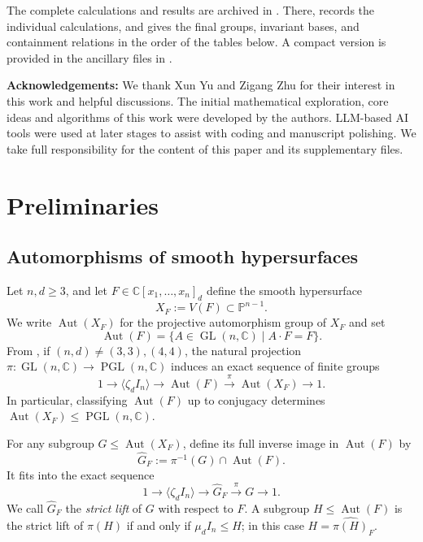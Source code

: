 \documentclass[12pt]{amsart}
\numberwithin{equation}{section}
\theoremstyle{plain}
\theoremstyle{definition}
\theoremstyle{remark}
\newcommand{\CC}{\mathbb C}
\newcommand{\PP}{\mathbb P}
\DeclareMathOperator{\Aut}{Aut}
\DeclareMathOperator{\GL}{GL}
\DeclareMathOperator{\PGL}{PGL}
\begin{document}
The complete calculations and results are archived in
\cite{FuWangZhengAutcub4fold2026}. There,  records
the individual calculations, and  gives the final groups,
invariant bases, and containment relations in the order of the tables below.
A compact version is provided in the ancillary files in .

\textbf{Acknowledgements:} We thank Xun Yu and Zigang Zhu for their interest in this work and helpful discussions. The initial mathematical exploration, core ideas and algorithms of this work were developed by the authors. LLM-based AI tools were used at later stages to assist with coding and manuscript polishing. We take full responsibility for the content of this paper and its supplementary files.



\section{Preliminaries}

\subsection{Automorphisms of smooth hypersurfaces}

Let $n,d\geq3$, and let $F\in\CC[x_1,\ldots,x_n]_d$ define the smooth
hypersurface
\[
X_F:=V(F)\subset\PP^{n-1}.
\]
We write $\Aut(X_F)$ for the projective automorphism group of $X_F$ and set
\[
\Aut(F)=\{A\in\GL(n,\CC)\mid A\cdot F=F\}.
\]
From \cite{Matsumura1963OnTA}, if $(n,d)\neq (3,3),(4,4)$, the natural
projection $\pi:\GL(n,\CC)\to\PGL(n,\CC)$ induces an exact sequence of finite groups
\begin{equation}\label{eq:linear-projective}
1\longrightarrow\langle\zeta_d I_n\rangle
\longrightarrow\Aut(F)\overset{\pi}{\longrightarrow}\Aut(X_F)
\longrightarrow 1.
\end{equation}
In particular, classifying $\Aut(F)$ up to conjugacy determines
$\Aut(X_F)\leq\PGL(n,\CC)$.

For any subgroup $G\leq\Aut(X_F)$, define its full inverse image in
$\Aut(F)$ by
\[
\widehat G_F:=\pi^{-1}(G)\cap\Aut(F).
\]
It fits into the exact sequence
\[
1\longrightarrow \langle\zeta_d I_n\rangle \longrightarrow \widehat G_F
\overset{\pi}{\longrightarrow}G
\longrightarrow 1.
\]
We call $\widehat G_F$ the \emph{strict lift} of $G$ with respect to $F$.
A subgroup $H\leq\Aut(F)$ is the strict lift of $\pi(H)$ if and only if
$\mu_dI_n\leq H$; in this case $H=\widehat{\pi(H)}_F$. 
\end{document}
